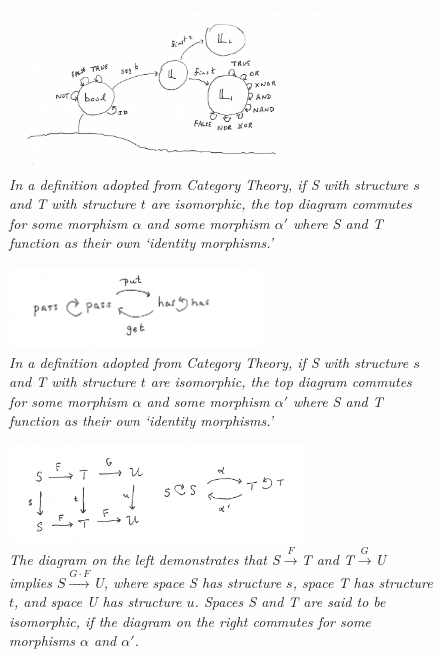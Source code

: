 \documentclass[11pt]{article}
\begin{document}
\begin{figure}[h]
\centering
\includegraphics[width=0.8\textwidth]{bool.pdf}
\caption{{\it In a definition adopted from Category Theory, if S with structure $s$ and T with structure $t$ are isomorphic, the top diagram commutes for some morphism $\alpha$ and some morphism $\alpha'$ where S and T function as their own `identity morphisms.' }}
\end{figure}

\begin{figure}[h]
\centering
\includegraphics[width=0.6\textwidth]{Pass-has.png}
\caption{{\it In a definition adopted from Category Theory, if S with structure $s$ and T with structure $t$ are isomorphic, the top diagram commutes for some morphism $\alpha$ and some morphism $\alpha'$ where S and T function as their own `identity morphisms.' }}
\end{figure}

\begin{figure}[h]
\centering
\includegraphics[width=0.7\textwidth]{Morphisms.png}
\caption{{\it The diagram on the left demonstrates that S${\overset F\longrightarrow}$T and T${\overset G\longrightarrow}$U implies $S{\overset {G\cdot F} \longrightarrow}$U, where space S has structure $s$, space T has structure $t$, and space U has structure $u$.  Spaces S and T are said to be isomorphic, if the diagram on the right commutes for some morphisms $\alpha$ and $\alpha'$.}}
\end{figure}
\end{document}
